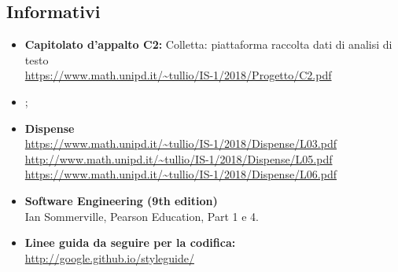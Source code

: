 \subsection{Informativi}
\begin{itemize}
\item \textbf{Capitolato d’appalto C2:} Colletta: piattaforma raccolta dati di analisi di testo\\
\url{https://www.math.unipd.it/~tullio/IS-1/2018/Progetto/C2.pdf}
\item \textbf{\PdP};
\item \textbf{Dispense} \\
\url{https://www.math.unipd.it/~tullio/IS-1/2018/Dispense/L03.pdf}\\
\url{http://www.math.unipd.it/~tullio/IS-1/2018/Dispense/L05.pdf}\\
\url{https://www.math.unipd.it/~tullio/IS-1/2018/Dispense/L06.pdf}\\


\item \textbf{Software Engineering (9th edition)}\\ Ian Sommerville, Pearson Education, Part 1 e 4.
\item \textbf{Linee guida da seguire per la codifica:} \\
\url{http://google.github.io/styleguide/}

\end{itemize}
